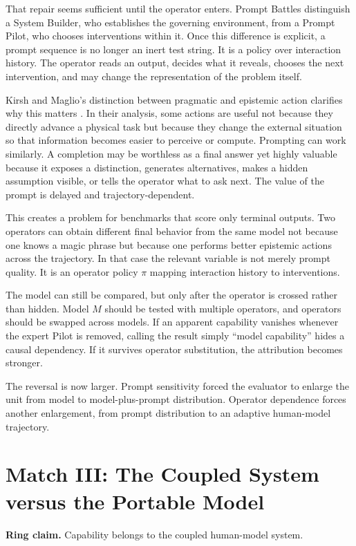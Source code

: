\documentclass[11pt]{article}
\newcommand{\ringclaim}[1]{\vspace{0.35em}\noindent\textbf{Ring claim.} #1\vspace{0.15em}}
\begin{document}
That repair seems sufficient until the operator enters. Prompt Battles distinguish a System Builder, who establishes the governing environment, from a Prompt Pilot, who chooses interventions within it. Once this difference is explicit, a prompt sequence is no longer an inert test string. It is a policy over interaction history. The operator reads an output, decides what it reveals, chooses the next intervention, and may change the representation of the problem itself.

Kirsh and Maglio's distinction between pragmatic and epistemic action clarifies why this matters \cite{kirsh1994distinguishing}. In their analysis, some actions are useful not because they directly advance a physical task but because they change the external situation so that information becomes easier to perceive or compute. Prompting can work similarly. A completion may be worthless as a final answer yet highly valuable because it exposes a distinction, generates alternatives, makes a hidden assumption visible, or tells the operator what to ask next. The value of the prompt is delayed and trajectory-dependent.

This creates a problem for benchmarks that score only terminal outputs. Two operators can obtain different final behavior from the same model not because one knows a magic phrase but because one performs better epistemic actions across the trajectory. In that case the relevant variable is not merely prompt quality. It is an operator policy $\pi$ mapping interaction history to interventions.

The model can still be compared, but only after the operator is crossed rather than hidden. Model $M$ should be tested with multiple operators, and operators should be swapped across models. If an apparent capability vanishes whenever the expert Pilot is removed, calling the result simply ``model capability'' hides a causal dependency. If it survives operator substitution, the attribution becomes stronger.

The reversal is now larger. Prompt sensitivity forced the evaluator to enlarge the unit from model to model-plus-prompt distribution. Operator dependence forces another enlargement, from prompt distribution to an adaptive human-model trajectory.

\section{Match III: The Coupled System versus the Portable Model}
\ringclaim{Capability belongs to the coupled human-model system.}
\end{document}
